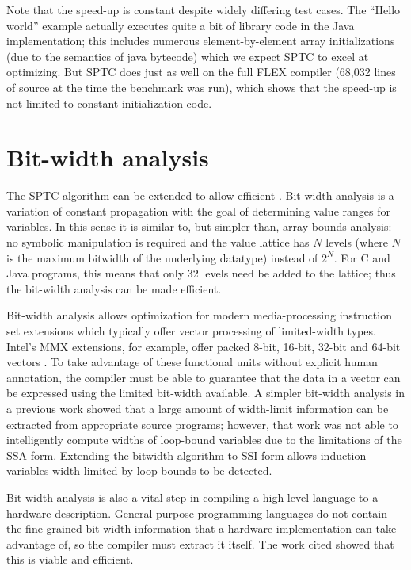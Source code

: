 Note that the speed-up is constant despite widely differing test
cases.  The ``Hello world'' example actually executes quite a bit of
library code in the Java implementation; this includes numerous
element-by-element array initializations (due to the semantics of
java bytecode) which we expect SPTC to excel at optimizing.  But SPTC
does just as well on the full FLEX compiler (68,032 lines of source
at the time the benchmark was run), which shows that the speed-up is
not limited to constant initialization code.

\section{Bit-width analysis}\label{sec:bitwidth}
The SPTC algorithm can be extended to allow efficient
.  Bit-width analysis is a variation of
constant propagation with the goal of determining value ranges for
variables.  In this sense it is similar to, but simpler than,
array-bounds analysis: no symbolic manipulation is required and the
value lattice has $N$ levels (where $N$ is the maximum bitwidth of the
underlying datatype) instead of $2^N$.  For C and Java programs, this
means that only 32 levels need be added to the lattice; thus the
bit-width analysis can be made efficient.

Bit-width analysis allows optimization for modern media-processing
instruction set extensions which typically offer vector processing of
limited-width types. Intel's MMX extensions, for example, offer packed
8-bit, 16-bit, 32-bit and 64-bit vectors \cite{peleg97:mmx}.
To take advantage of these functional units without explicit human
annotation, the compiler must be able to guarantee that the data in a
vector can be expressed using the limited bit-width available.  A
simpler bit-width analysis in a previous work \cite{ananian:siliconc}
showed that a large amount of width-limit information can be extracted
from appropriate source programs; however, that work was not able to
intelligently compute widths of loop-bound variables due to the
limitations of the SSA form.  Extending the bitwidth algorithm to SSI
form allows induction variables width-limited by loop-bounds to be
detected.

Bit-width analysis is also a vital step in compiling a high-level
language to a hardware description.  General purpose programming
languages do not contain the fine-grained bit-width information that a
hardware implementation can take advantage of, so the compiler must
extract it itself.  The work cited showed that this is viable
and efficient.

